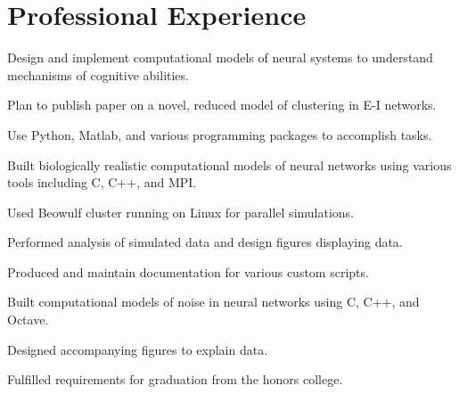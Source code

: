 \documentclass[]{deedy-resume-openfont}
\begin{document}
\begin{minipage}[t]{0.63\textwidth} 


\section{Professional Experience}

\vspace{\topsep} %
\begin{tightemize}
	\regdescript
	\item Design and implement computational models of neural systems to understand mechanisms of cognitive abilities.\\
	\item Plan to publish paper on a novel, reduced model of clustering in E-I networks.\\
	\item Use Python, Matlab, and various programming packages to accomplish tasks.\\
\end{tightemize}
\sectionsep

\begin{tightemize}
	\regdescript
	\item Built biologically realistic computational models of neural networks using various tools including C, C++, and MPI.
	\item Used Beowulf cluster running on Linux for parallel simulations.
	\item Performed analysis of simulated data and design figures displaying data.
	\item Produced and maintain documentation for various custom scripts.
\end{tightemize}
\sectionsep

\begin{tightemize}
	\regdescript
	\item Built computational models of noise in neural networks using C, C++, and Octave.\\
	\item Designed accompanying figures to explain data.\\
	\item Fulfilled requirements for graduation from the honors college.\\
\end{tightemize}
\sectionsep


\end{minipage}
\end{document}

